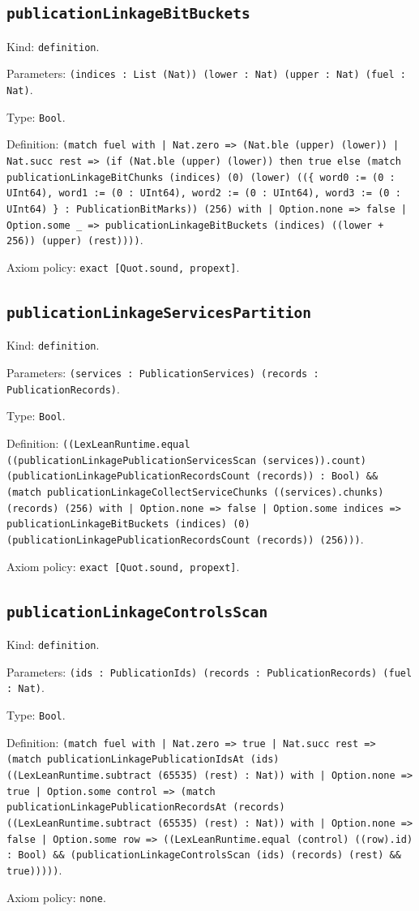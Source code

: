 \documentclass[11pt]{article}
\begin{document}
\subsection*{\texttt{publicationLinkageBitBuckets}}
\noindent Kind: \texttt{definition}.\par
\noindent Parameters: \texttt{(indices : List (Nat)) (lower : Nat) (upper : Nat) (fuel : Nat)}.\par
\noindent Type: \texttt{Bool}.\par
\noindent Definition: \texttt{(match fuel with | Nat.zero => (Nat.ble (upper) (lower)) | Nat.succ rest => (if (Nat.ble (upper) (lower)) then true else (match publicationLinkageBitChunks (indices) (0) (lower) ((\{ word0 := (0 : UInt64), word1 := (0 : UInt64), word2 := (0 : UInt64), word3 := (0 : UInt64) \} : PublicationBitMarks)) (256) with | Option.none => false | Option.some \_ => publicationLinkageBitBuckets (indices) ((lower + 256)) (upper) (rest))))}.\par
\noindent Axiom policy: \texttt{exact [Quot.sound, propext]}.\par
\subsection*{\texttt{publicationLinkageServicesPartition}}
\noindent Kind: \texttt{definition}.\par
\noindent Parameters: \texttt{(services : PublicationServices) (records : PublicationRecords)}.\par
\noindent Type: \texttt{Bool}.\par
\noindent Definition: \texttt{((LexLeanRuntime.equal ((publicationLinkagePublicationServicesScan (services)).count) (publicationLinkagePublicationRecordsCount (records)) : Bool) \&\& (match publicationLinkageCollectServiceChunks ((services).chunks) (records) (256) with | Option.none => false | Option.some indices => publicationLinkageBitBuckets (indices) (0) (publicationLinkagePublicationRecordsCount (records)) (256)))}.\par
\noindent Axiom policy: \texttt{exact [Quot.sound, propext]}.\par
\subsection*{\texttt{publicationLinkageControlsScan}}
\noindent Kind: \texttt{definition}.\par
\noindent Parameters: \texttt{(ids : PublicationIds) (records : PublicationRecords) (fuel : Nat)}.\par
\noindent Type: \texttt{Bool}.\par
\noindent Definition: \texttt{(match fuel with | Nat.zero => true | Nat.succ rest => (match publicationLinkagePublicationIdsAt (ids) ((LexLeanRuntime.subtract (65535) (rest) : Nat)) with | Option.none => true | Option.some control => (match publicationLinkagePublicationRecordsAt (records) ((LexLeanRuntime.subtract (65535) (rest) : Nat)) with | Option.none => false | Option.some row => ((LexLeanRuntime.equal (control) ((row).id) : Bool) \&\& (publicationLinkageControlsScan (ids) (records) (rest) \&\& true)))))}.\par
\noindent Axiom policy: \texttt{none}.\par
\end{document}
